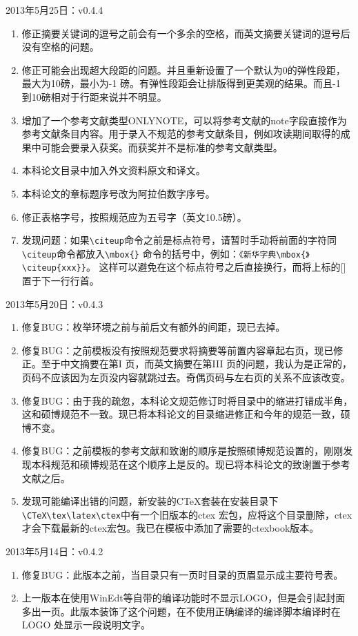 \noindent
2013年5月25日：v0.4.4
\begin{enumerate}
\item 修正摘要关键词的逗号之前会有一个多余的空格，而英文摘要关键词的逗号后没有空格的问题。
\item 修正可能会出现超大段距的问题。并且重新设置了一个默认为0的弹性段距，最大为10磅，最小为-1 磅。有弹性段距会让排版得到更美观的结果。而且-1 到10磅相对于行距来说并不明显。
\item 增加了一个参考文献类型ONLYNOTE，可以将参考文献的note字段直接作为参考文献条目内容。用于录入不规范的参考文献条目，例如攻读期间取得的成果中可能会要录入获奖\cite{onlynoteexample}。而获奖并不是标准的参考文献类型。
\item 本科论文目录中加入外文资料原文和译文。
\item 本科论文的章标题序号改为阿拉伯数字序号。
\item 修正表格字号，按照规范应为五号字（英文10.5磅）。
\item 发现问题：如果\verb|\citeup|命令之前是标点符号，请暂时手动将前面的字符同\verb|\citeup|命令都放入\verb|\mbox{}| 命令的括号中，例如：\verb|《新华字典\mbox{》\citeup{xxx}}|。 这样可以避免在这个标点符号之后直接换行，而将上标的[] 置于下一行行首。
\end{enumerate}

\noindent
2013年5月20日：v0.4.3
\begin{enumerate}
\item 修复BUG：枚举环境之前与前后文有额外的间距，现已去掉。
\item 修复BUG：之前模板没有按照规范要求将摘要等前置内容章起右页，现已修正。至于中文摘要在第I 页，而英文摘要在第III 页的问题，我认为是正常的，页码不应该因为左页没内容就跳过去。奇偶页码与左右页的关系不应该改变。
\item 修复BUG：由于我的疏忽，本科论文规范修订时将目录中的缩进打错成半角，这和硕博规范不一致。现已将本科论文的目录缩进修正和今年的规范一致，硕博不变。
\item 修复BUG：之前模板的参考文献和致谢的顺序是按照硕博规范设置的，刚刚发现本科规范和硕博规范在这个顺序上是反的。现已将本科论文的致谢置于参考文献之后。
\item 发现可能编译出错的问题，新安装的CTeX套装在安装目录下\verb|\CTeX\tex\latex\ctex|中有一个旧版本的ctex 宏包，应将这个目录删除，ctex 才会下载最新的ctex宏包。我已在模板中添加了需要的ctexbook版本。
\end{enumerate}

\noindent
2013年5月14日：v0.4.2
\begin{enumerate}
\item 修复BUG：此版本之前，当目录只有一页时目录的页眉显示成主要符号表。
\item 上一版本在使用WinEdt等自带的编译功能时不显示LOGO，但是会引起封面多出一页。此版本装饰了这个问题，在不使用正确编译的编译脚本编译时在LOGO 处显示一段说明文字。

\end{enumerate}

